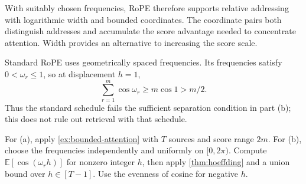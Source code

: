 \begin{exercisechunk}
With suitably chosen frequencies, RoPE therefore supports relative addressing
with logarithmic width and bounded coordinates. The coordinate pairs both
distinguish addresses and accumulate the score advantage needed to concentrate
attention. Width provides an alternative to increasing the score scale.

Standard RoPE uses geometrically spaced frequencies. Its frequencies satisfy
$0<\omega_r\le1$, so at displacement $h=1$,
\[
\sum_{r=1}^m\cos\omega_r\ge m\cos1>m/2.
\]
Thus the standard schedule fails the sufficient separation condition in
part (b); this does not rule out retrieval with that schedule.

\begin{hints}
For (a), apply \cref{ex:bounded-attention} with $T$ sources and score range
$2m$. For (b), choose the frequencies independently and uniformly on
$[0,2\pi)$. Compute $\mathbb E[\cos(\omega_r h)]$ for nonzero integer $h$,
then apply \cref{thm:hoeffding} and a union bound over $h\in[T-1]$. Use the
evenness of cosine for negative $h$.
\end{hints}
\end{exercisechunk}
